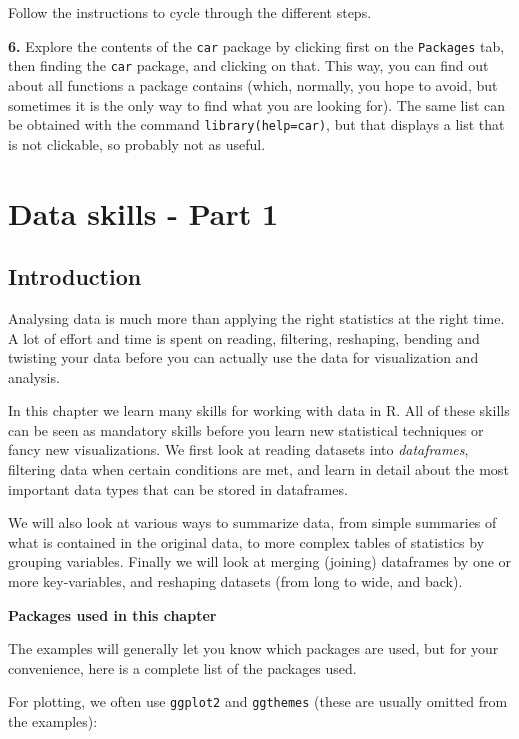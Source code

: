 \documentclass[]{book}
\begin{document}
Follow the instructions to cycle through the different steps.

\textbf{6.} Explore the contents of the \texttt{car} package by clicking first on the \texttt{Packages} tab, then finding the \texttt{car} package, and clicking on that. This way, you can find out about all functions a package contains (which, normally, you hope to avoid, but sometimes it is the only way to find what you are looking for). The same list can be obtained with the command \texttt{library(help=car)}, but that displays a list that is not clickable, so probably not as useful.

\hypertarget{dataskills1}{%
\chapter{Data skills - Part 1}\label{dataskills1}}

\hypertarget{introduction}{%
\section{Introduction}\label{introduction}}

Analysing data is much more than applying the right statistics at the right time. A lot of effort and time is spent on reading, filtering, reshaping, bending and twisting your data before you can actually use the data for visualization and analysis.

In this chapter we learn many skills for working with data in R. All of these skills can be seen as mandatory skills before you learn new statistical techniques or fancy new visualizations. We first look at reading datasets into \emph{dataframes}, filtering data when certain conditions are met, and learn in detail about the most important data types that can be stored in dataframes.

We will also look at various ways to summarize data, from simple summaries of what is contained in the original data, to more complex tables of statistics by grouping variables. Finally we will look at merging (joining) dataframes by one or more key-variables, and reshaping datasets (from long to wide, and back).

\textbf{Packages used in this chapter}

The examples will generally let you know which packages are used, but for your convenience, here is a complete list of the packages used.

For plotting, we often use \texttt{ggplot2} and \texttt{ggthemes} (these are usually omitted from the examples):
\end{document}
